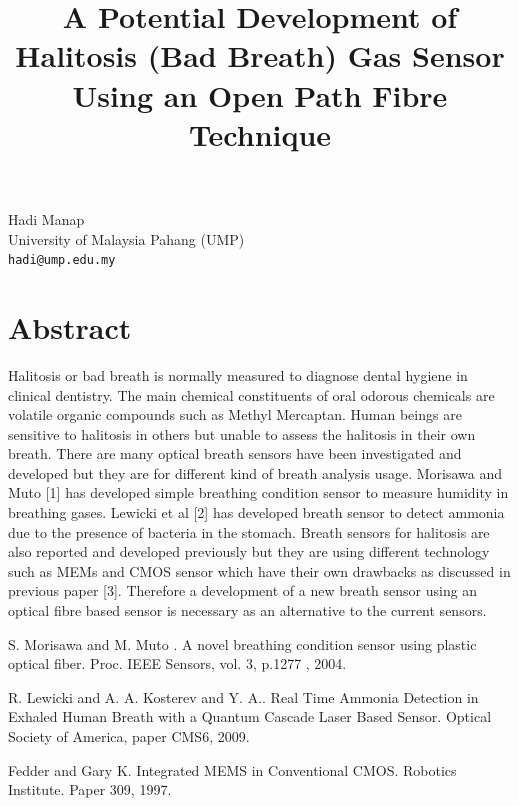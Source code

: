 \documentclass[article,A4,11pt]{llncs}%
\begin{document}
\title{A Potential Development of Halitosis (Bad Breath) Gas Sensor Using an Open Path Fibre Technique}
 \author{} \institute{}
\maketitle
\begin{center}
{\large Hadi Manap}\\
University of Malaysia Pahang (UMP)\\
{\tt hadi@ump.edu.my}
\end{center}

\section*{Abstract}
Halitosis or bad breath is normally measured to diagnose dental hygiene in clinical dentistry. The main chemical constituents of oral odorous chemicals are volatile organic compounds such as Methyl Mercaptan. Human beings are sensitive to halitosis in others but unable to assess the halitosis in their own breath. There are many optical breath sensors have been investigated and developed but they are for different kind of breath analysis usage. Morisawa and Muto [1] has developed simple breathing condition sensor to measure humidity in breathing gases. Lewicki et al [2] has developed breath sensor to detect ammonia due to the presence of bacteria in the stomach. Breath sensors for halitosis are also reported and developed previously but they are using different technology such as MEMs and CMOS sensor which have their own drawbacks as discussed in previous paper [3]. Therefore a development of a new breath sensor using an optical fibre based sensor is necessary as an alternative to the current sensors.


\begin{thebibliography}{10}
{\sc S. Morisawa and M. Muto }. {A novel breathing condition sensor using plastic optical fiber}. Proc. IEEE Sensors, vol. 3, p.1277 , 2004.

{\sc R. Lewicki and A. A. Kosterev and Y. A.}. {Real Time Ammonia Detection in Exhaled Human Breath with a Quantum Cascade Laser Based Sensor}. Optical Society of America, paper CMS6, 2009.

{\sc Fedder  and Gary K}. {Integrated MEMS in Conventional CMOS}. Robotics Institute. Paper 309, 1997.
\end{thebibliography}
\end{document}
